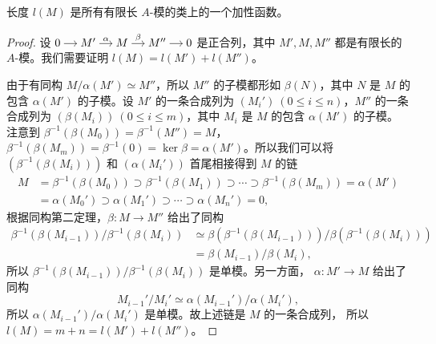 \begin{proposition}
  长度 $l(M)$ 是所有有限长 $A$-模的类上的一个加性函数。
\end{proposition}
\begin{proof}
  设
  $
    \begin{tikzcd}[cramped,column sep=small]
      0\arrow[r] & M'\arrow[r,"\alpha"] & M\arrow[r,"\beta"] & M''\arrow[r] & 0
    \end{tikzcd}
  $
  是正合列，其中 $M',M,M''$ 都是有限长的 $A$-模。我们需要证明 $l(M)=l(M')+l(M'')$。

  由于有同构 $M/\alpha(M')\simeq M''$，所以 $M''$ 的子模都形如 $\beta(N)$，其中 $N$ 是 $M$ 的包含
  $\alpha(M')$ 的子模。设 $M'$ 的一条合成列为 $(M_i')\ (0\leq i\leq n)$，$M''$ 的一条
  合成列为 $(\beta(M_i))\ (0\leq i\leq m)$，其中 $M_i$ 是 $M$ 的包含 $\alpha(M')$ 的子模。
  注意到 $\beta^{-1}(\beta(M_0))=\beta^{-1}(M'')=M$，
  $\beta^{-1}(\beta(M_m))=\beta^{-1}(0)=\ker\beta=\alpha(M')$。所以我们可以将
  $(\beta^{-1}(\beta(M_i)))$ 和 $(\alpha(M_i'))$ 首尾相接得到 $M$ 的链
  \begin{align*}
    M&=\beta^{-1}(\beta(M_0))\supset \beta^{-1}(\beta(M_1))\supset\cdots\supset
    \beta^{-1}(\beta(M_m))=\alpha(M')\\
    &=\alpha(M_0')\supset \alpha(M_1')\supset \cdots\supset
    \alpha(M_n')=0,
  \end{align*}
  根据同构第二定理，$\beta:M\to M''$ 给出了同构
  \begin{align*}
    \beta^{-1}(\beta(M_{i-1}))/\beta^{-1}(\beta(M_i))
    &\simeq \beta(\beta^{-1}(\beta(M_{i-1})))/\beta(\beta^{-1}(\beta(M_{i})))\\
    &=\beta(M_{i-1})/\beta(M_i),
  \end{align*}
  所以 $\beta^{-1}(\beta(M_{i-1}))/\beta^{-1}(\beta(M_i))$ 是单模。另一方面，
  $\alpha:M'\to M$ 给出了同构
  \[
    M_{i-1}'/M_i'\simeq \alpha(M_{i-1}')/\alpha(M_i'),
  \]
  所以 $\alpha(M_{i-1}')/\alpha(M_i')$ 是单模。故上述链是 $M$ 的一条合成列，
  所以 $l(M)=m+n=l(M')+l(M'')$。
\end{proof}

